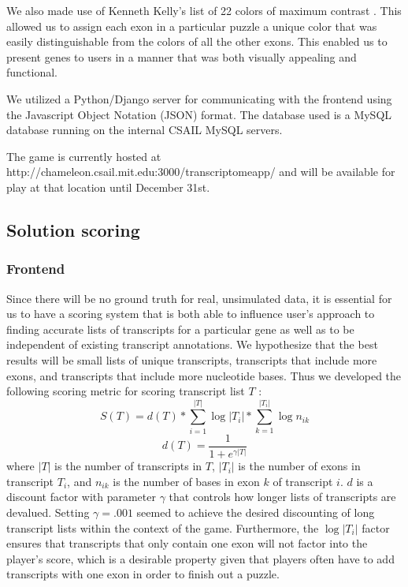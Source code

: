 \documentclass[12pt]{article}
\begin{document}
We also made use of Kenneth Kelly's list of 22 colors of maximum contrast \citep{green2010colour}. This allowed us to assign each exon in a particular puzzle a unique color that was easily distinguishable from the colors of all the other exons. This enabled us to present genes to 
users in a manner that was both visually appealing and functional.

We utilized a Python/Django server for communicating with the frontend using the Javascript Object Notation (JSON) format. The database used is a MySQL database running on the internal CSAIL MySQL servers. 

The game is currently hosted at http://chameleon.csail.mit.edu:3000/transcriptomeapp/ and will be available for play at that location until December 31st.

\subsection*{Solution scoring} 

\subsubsection*{Frontend}
\label{sec:scoring}
Since there will be no ground truth for real, unsimulated data, it is essential for us to have
a scoring system that is both able to influence user's approach to finding accurate lists of transcripts for a particular gene as well as to be independent of existing transcript annotations. We hypothesize that the best results will be small lists of unique transcripts, transcripts that include more exons, and transcripts that include more nucleotide bases.
Thus we developed the following scoring metric for scoring transcript list $T$ :
\begin{equation*}
S(T) = d(T) * \sum_{i=1}^{|T|} \log{|T_i|} * \sum_{k = 1}^{|T_i|} \log{n_{ik}}
\end{equation*}
\begin{equation*}
d(T) = \frac{1}{1+e^{\gamma |T|}}
\end{equation*}
where $|T|$ is the number of transcripts in $T$, $|T_i|$ is the number of exons in transcript $T_i$, and $n_{ik}$ is the number of bases in exon $k$ of transcript $i$.
$d$ is a discount factor with parameter $\gamma$ that controls how longer lists of transcripts are devalued. Setting $\gamma = .001$ seemed to achieve the desired
discounting of long transcript lists within the context of the game. Furthermore, the $\log{|T_i|}$ factor ensures that transcripts that only contain one exon will not factor
into the player's score, which is a desirable property given that players often have to add transcripts with one exon in order to finish out a puzzle.
\end{document}
